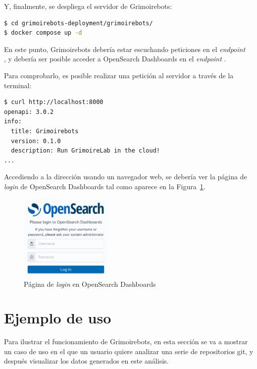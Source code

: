 Y, finalmente, se despliega el servidor de Grimoirebots:

\begin{lstlisting}[language=bash]
$ cd grimoirebots-deployment/grimoirebots/
$ docker compose up -d
\end{lstlisting}

En este punto, Grimoirebots debería estar escuchando peticiones en el \emph{endpoint}\\, y debería ser posible acceder a OpenSearch Dashboards en el \emph{endpoint} .

Para comprobarlo, es posible realizar una petición al servidor a través de la terminal:

\begin{lstlisting}[language=bash]
$ curl http://localhost:8000
openapi: 3.0.2
info:
  title: Grimoirebots
  version: 0.1.0
  description: Run GrimoireLab in the cloud!
...
\end{lstlisting}

Accediendo a la dirección  usando un navegador web, se debería ver la página de \emph{login} de OpenSearch Dashboards tal como aparece en la Figura~\ref{fig:opensearch-dashboards-login}.

\begin{figure}[ht]
    \centering
    \includegraphics[width=0.4\textwidth]{Figures/opensearch-dashboards-login}
    \decoRule
    \caption[OpenSearch Dashboards (\emph{Login})]{Página de \emph{login} en OpenSearch Dashboards}
    \label{fig:opensearch-dashboards-login}
\end{figure}

\section{Ejemplo de uso}

Para ilustrar el funcionamiento de Grimoirebots, en esta sección se va a mostrar un caso de uso en el que un usuario quiere analizar una serie de repositorios git, y después visualizar los datos generados en este análisis.

